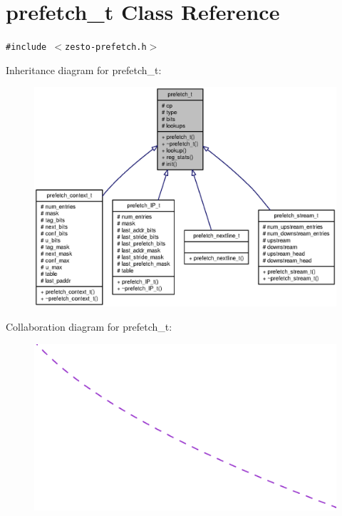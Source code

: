 \section{prefetch\_\-t Class Reference}
\label{classprefetch__t}
{\tt \#include $<$zesto-prefetch.h$>$}

Inheritance diagram for prefetch\_\-t:\nopagebreak
\begin{figure}[H]
\begin{center}
\leavevmode
\includegraphics[width=400pt]{classprefetch__t__inherit__graph}
\end{center}
\end{figure}
Collaboration diagram for prefetch\_\-t:\nopagebreak
\begin{figure}[H]
\begin{center}
\leavevmode
\includegraphics[width=400pt]{classprefetch__t__coll__graph}
\end{center}
\end{figure}
